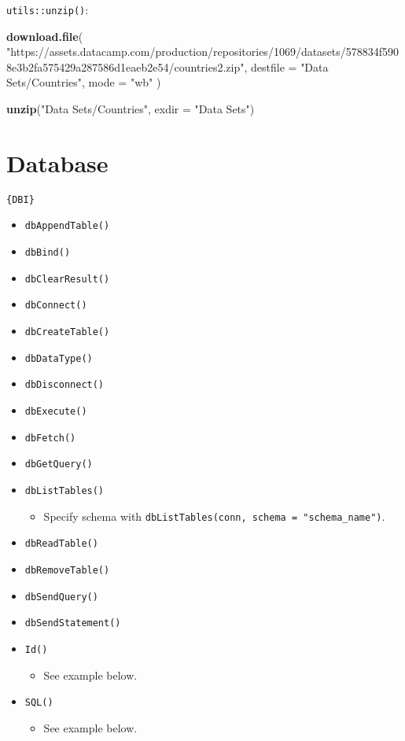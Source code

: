 \documentclass[
]{book}
\newenvironment{Shaded}{\begin{snugshade}}{\end{snugshade}}
\newcommand{\DataTypeTok}[1]{\textcolor[rgb]{0.13,0.29,0.53}{#1}}
\newcommand{\KeywordTok}[1]{\textcolor[rgb]{0.13,0.29,0.53}{\textbf{#1}}}
\newcommand{\NormalTok}[1]{#1}
\newcommand{\StringTok}[1]{\textcolor[rgb]{0.31,0.60,0.02}{#1}}
\providecommand{\tightlist}{%
  \setlength{\itemsep}{0pt}\setlength{\parskip}{0pt}}
\begin{document}
\texttt{utils::unzip()}:

\begin{Shaded}
\begin{Highlighting}[]
\KeywordTok{download.file}\NormalTok{(}
  \StringTok{"https://assets.datacamp.com/production/repositories/1069/datasets/578834f5908e3b2fa575429a287586d1eaeb2e54/countries2.zip"}\NormalTok{,}
  \DataTypeTok{destfile =} \StringTok{"Data Sets/Countries"}\NormalTok{,}
  \DataTypeTok{mode =} \StringTok{"wb"}
\NormalTok{)}

\KeywordTok{unzip}\NormalTok{(}\StringTok{"Data Sets/Countries"}\NormalTok{, }\DataTypeTok{exdir =} \StringTok{"Data Sets"}\NormalTok{)}
\end{Highlighting}
\end{Shaded}

\hypertarget{database}{%
\section{Database}\label{database}}

\texttt{\{DBI\}}

\begin{itemize}
\tightlist
\item
  \texttt{dbAppendTable()}
\item
  \texttt{dbBind()}
\item
  \texttt{dbClearResult()}
\item
  \texttt{dbConnect()}
\item
  \texttt{dbCreateTable()}
\item
  \texttt{dbDataType()}
\item
  \texttt{dbDisconnect()}
\item
  \texttt{dbExecute()}
\item
  \texttt{dbFetch()}
\item
  \texttt{dbGetQuery()}
\item
  \texttt{dbListTables()}

  \begin{itemize}
  \tightlist
  \item
    Specify schema with \texttt{dbListTables(conn,\ schema\ =\ "schema\_name")}.
  \end{itemize}
\item
  \texttt{dbReadTable()}
\item
  \texttt{dbRemoveTable()}
\item
  \texttt{dbSendQuery()}
\item
  \texttt{dbSendStatement()}
\item
  \texttt{Id()}

  \begin{itemize}
  \tightlist
  \item
    See example below.
  \end{itemize}
\item
  \texttt{SQL()}

  \begin{itemize}
  \tightlist
  \item
    See example below.
  \end{itemize}
\end{itemize}
\end{document}
